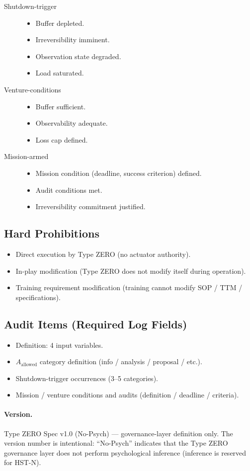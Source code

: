 \begin{description}
\item[Shutdown-trigger]
\begin{itemize}
\item Buffer depleted.
\item Irreversibility imminent.
\item Observation state degraded.
\item Load saturated.
\end{itemize}
\item[Venture-conditions]
\begin{itemize}
\item Buffer sufficient.
\item Observability adequate.
\item Loss cap defined.
\end{itemize}
\item[Mission-armed]
\begin{itemize}
\item Mission condition (deadline, success criterion) defined.
\item Audit conditions met.
\item Irreversibility commitment justified.
\end{itemize}
\end{description}

\subsection{Hard Prohibitions}
\label{sec:def-offense-hard-rules}

\begin{itemize}
\item Direct execution by Type ZERO (no actuator authority).
\item In-play modification (Type ZERO does not modify itself during
operation).
\item Training requirement modification (training cannot modify SOP
/ TTM / specifications).
\end{itemize}

\subsection{Audit Items (Required Log Fields)}
\label{sec:def-offense-audit}

\begin{itemize}
\item Definition: 4 input variables.
\item $A_{\mathrm{allowed}}$ category definition (info / analysis /
proposal / etc.).
\item Shutdown-trigger occurrences (3--5 categories).
\item Mission / venture conditions and audits (definition /
deadline / criteria).
\end{itemize}

\paragraph{Version.}
Type ZERO Spec v1.0 (No-Psych) --- governance-layer definition only.
The version number is intentional: ``No-Psych'' indicates that the
Type ZERO governance layer does not perform psychological inference
(inference is reserved for HST-N).
